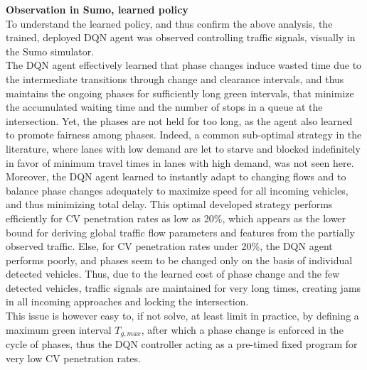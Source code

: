 \textbf{Observation in Sumo, learned policy} \\
To understand the learned policy, and thus confirm the above analysis, the trained, deployed DQN agent was observed controlling traffic signals, visually in the Sumo simulator. \\
The DQN agent effectively learned that phase changes induce wasted time due to the intermediate transitions through change and clearance intervals, and thus maintains the ongoing phases for sufficiently long green intervals, that minimize the accumulated waiting time and the number of stops in a queue at the intersection. Yet, the phases are not held for too long, as the agent also learned to promote fairness among phases. Indeed, a common sub-optimal strategy in the literature, where lanes with low demand are let to starve and blocked indefinitely in favor of minimum travel times in lanes with high demand, was not seen here. Moreover, the DQN agent learned to instantly adapt to changing flows and to balance phase changes adequately to maximize speed for all incoming vehicles, and thus minimizing total delay. This optimal developed strategy performs efficiently for CV penetration rates as low as 20\%, which appears as the lower bound for deriving global traffic flow parameters and features from the partially observed traffic. Else, for CV penetration rates under 20\%, the DQN agent performs poorly, and phases seem to be changed only on the basis of individual detected vehicles. Thus, due to the learned cost of phase change and the few detected vehicles, traffic signals are maintained for very long times, creating jams in all incoming approaches and locking the intersection.  \\
This issue is however easy to, if not solve, at least limit in practice, by defining a maximum green interval $T_{g,max}$, after which a phase change is enforced in the cycle of phases, thus the DQN controller acting as a pre-timed fixed program for very low CV penetration rates. \\

